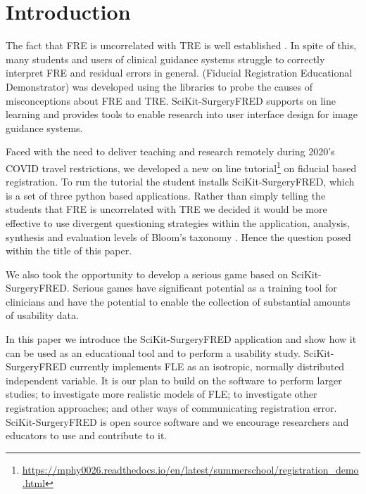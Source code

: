 \section{Introduction}
The fact that \gls{FRE} is uncorrelated with \gls{TRE} is well established 
\cite{fitzpatrick2009}. In spite of this, many students and users of clinical guidance systems struggle to 
correctly interpret \gls{FRE} and residual errors in general. 
\fred (Fiducial Registration Educational Demonstrator)
 \cite{stephen_thompson_2020_4314971} was developed using the 
\sksurgery \cite{PMID:32436132} libraries to probe the causes of misconceptions 
about \gls{FRE} and \gls{TRE}. SciKit-SurgeryFRED supports on line learning and provides tools to enable 
research into user interface design for image guidance systems. 

Faced with the need to deliver teaching and research remotely during 2020's {COVID} travel restrictions, we 
developed a new on line tutorial\footnote{\url{https://mphy0026.readthedocs.io/en/latest/summerschool/registration_demo.html}}
on fiducial based registration. To run the tutorial the student installs SciKit-SurgeryFRED, which is a 
set of three python based applications. Rather than simply telling the students that \gls{FRE} is uncorrelated with \gls{TRE} 
we decided it would be more effective to use divergent questioning strategies\cite{Tofade155} within the application, analysis, synthesis and 
evaluation levels of Bloom's taxonomy \cite{blooms_tax}. Hence the question posed within the title of this paper. 

We also took the opportunity to develop a serious game based on SciKit-SurgeryFRED. Serious games have significant potential 
as a training tool for clinicians \cite{PMID:28133947} and have the potential to enable the collection of substantial amounts of 
usability data. 

In this paper we introduce the SciKit-SurgeryFRED application and show how it can
be used as an educational tool and to perform a usability study. SciKit-SurgeryFRED 
currently implements \gls{FLE} as an isotropic, normally distributed independent variable. 
It is our plan to build on 
the software to perform larger studies; to investigate more realistic models of \gls{FLE};
to investigate other registration approaches; and other ways of communicating registration error. 
SciKit-SurgeryFRED is open 
source software and we encourage researchers and educators to use and contribute to it. 

